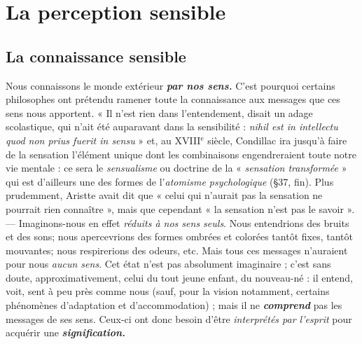 \chapter{La perception sensible}

\section{La connaissance sensible}%
Nous connaissons le monde
extérieur \textbf{\textit {par nos sens.}} C’est pourquoi certains philosophes ont prétendu
ramener toute la connaissance aux messages que ces sens nous
apportent. « Il n’est rien dans l’entendement, disait un adage scolastique,
qui n’ait été auparavant dans la sensibilité : {\it nihil est in intellectu
quod non prius fuerit in sensu} » et, au {\footnotesize XVIII}$^\text{e}$ siècle, Condillac ira
jusqu’à faire de la sensation l’élément unique dont les combinaisons
engendreraient toute notre vie mentale : ce sera le {\it sensualisme} ou
doctrine de la « {\it sensation transformée} » qui est d’ailleurs une des formes
de l’{\it atomisme psychologique} (\S 37, fin). Plus prudemment, Aristte
avait dit que « celui qui n’aurait pas la sensation ne pourrait
rien connaître », mais que cependant « la sensation n’est pas le savoir ».
— Imaginons-nous en effet {\it réduits à nos sens seuls}. Nous entendrions
des bruits et des sons; nous apercevrions des formes ombrées et
colorées tantôt fixes, tantôt mouvantes; nous respirerions des
odeurs, etc. Mais tous ces messages n’auraient pour nous {\it aucun sens}.
Cet état n’est pas absolument imaginaire ; c’est sans doute, approximativement,
celui du tout jeune enfant, du nouveau-né : il entend,
voit, sent à peu près comme nous (sauf, pour la vision notamment,
certains phénomènes d’adaptation et d’accommodation) ; mais il ne
\textbf{\textit {comprend}} pas les messages de ses sens. Ceux-ci ont donc besoin
d’être {\it interprétés par l'esprit} pour acquérir une \textbf{\textit {signification.}}

